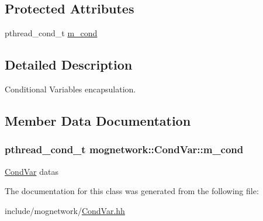 \subsection*{Protected Attributes}
\begin{DoxyCompactItemize}
\item 
pthread\-\_\-cond\-\_\-t \hyperlink{classmognetwork_1_1_cond_var_adc18d17b3c2e11768b1103b499f49c97}{m\-\_\-cond}
\end{DoxyCompactItemize}


\subsection{Detailed Description}
Conditional Variables encapsulation. 

\subsection{Member Data Documentation}
\hypertarget{classmognetwork_1_1_cond_var_adc18d17b3c2e11768b1103b499f49c97}{
\subsubsection[{m\-\_\-cond}]{\setlength{\rightskip}{0pt plus 5cm}pthread\-\_\-cond\-\_\-t mognetwork\-::\-Cond\-Var\-::m\-\_\-cond\hspace{0.3cm}{\ttfamily [protected]}}}\label{classmognetwork_1_1_cond_var_adc18d17b3c2e11768b1103b499f49c97}
\hyperlink{classmognetwork_1_1_cond_var}{Cond\-Var} datas 

The documentation for this class was generated from the following file\-:\begin{DoxyCompactItemize}
\item 
include/mognetwork/\hyperlink{_cond_var_8hh}{Cond\-Var.\-hh}\end{DoxyCompactItemize}

